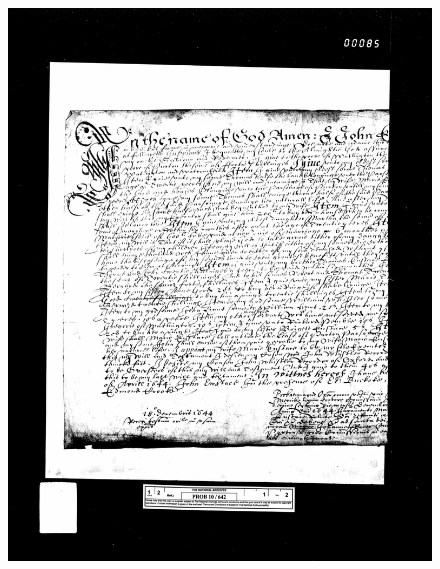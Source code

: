 %
\newcommand{\pixht}{0.3\textheight}
\begin{figure}
\begin{center}
\mbox{
\hspace{1.2cm}
\includegraphics[height=\pixht]{images/WillExample1644_page86_1.pdf}
\hspace{0.4cm}
}
\end{center}
\end{figure}
